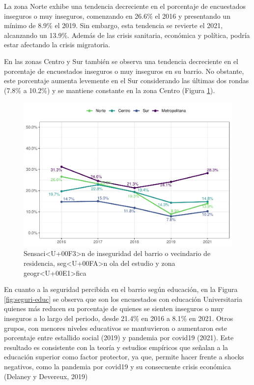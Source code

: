 \documentclass[
  12pt,
]{book}
\begin{document}
La zona Norte exhibe una tendencia decreciente en el porcentaje de encuestados inseguros o muy inseguros, comenzando en 26.6\% el 2016 y presentando un mínimo de 8.9\% el 2019. Sin embargo, esta tendencia se revierte el 2021, alcanzando un 13.9\%. Además de las crisis sanitaria, económica y política, podría estar afectando la crisis migratoria.

En las zonas Centro y Sur también se observa una tendencia decreciente en el porcentaje de encuestados inseguros o muy inseguros en su barrio. No obstante, este porcentaje aumenta levemente en el Sur considerando las últimas dos rondas (7.8\% a 10.2\%) y se mantiene constante en la zona Centro (Figura \ref{fig:seguri-zona}).

\begin{figure}

{\centering \includegraphics{reporte-elsoc_files/figure-latex/seguri-zona-1} 

}

\caption{Sensaci<U+00F3>n de inseguridad del barrio o vecindario de residencia, seg<U+00FA>n ola del estudio y zona geogr<U+00E1>fica}\label{fig:seguri-zona}
\end{figure}

En cuanto a la seguridad percibida en el barrio según educación, en la Figura \ref{fig:seguri-educ} se observa que son los encuestados con educación Universitaria quienes más reducen su porcentaje de quienes se sienten inseguros o muy inseguros a lo largo del periodo, desde 21.4\% en 2016 a 8.1\% en 2021. Otros grupos, con menores niveles educativos se mantuvieron o aumentaron este porcentaje entre estallido social (2019) y pandemia por covid19 (2021). Este resultado es consistente con la teoría y estudios empíricos que señalan a la educación superior como factor protector, ya que, permite hacer frente a shocks negativos, como la pandemia por covid19 y su consecuente crisis económica (Delaney y Devereux, 2019)
\end{document}
